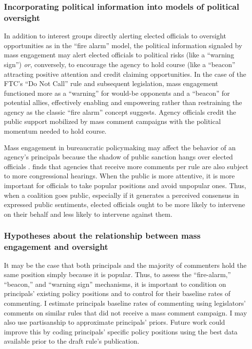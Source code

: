 \subsubsection{Incorporating political information into models of political oversight}
In addition to interest groups directly alerting elected officials to oversight opportunities as in the ``fire alarm'' model,
the political information signaled by mass engagement may alert elected officials to political risks (like a ``warning sign'')
\emph{or}, conversely, to encourage the agency to hold course (like a ``beacon'' attracting positive attention and credit claiming opportunities. In the case of the FTC's ``Do Not Call'' rule and subsequent legislation, mass engagement functioned more as a ``warning'' for would-be opponents and a ``beacon'' for potential allies, effectively enabling and empowering rather than restraining the agency as the classic ``fire alarm'' concept suggests. Agency officials credit the public support mobilized by mass comment campaigns with the political momentum needed to hold course. 

Mass engagement in bureaucratic policymaking may affect the behavior of an agency's principals because the shadow of public sanction hangs over elected officials \citep{Arnold1979, Mayhew2000}. \citet{Moore2018} finds that agencies that receive more comments per rule are also subject to more congressional hearings. When the public is more attentive, it is more important for officials to take popular positions and avoid unpopular ones.
Thus, when a coalition goes public, especially if it generates a perceived consensus in expressed public sentiments, elected officials ought to be more likely to intervene on their behalf and less likely to intervene against them.  

\subsubsection{Hypotheses about the relationship between mass engagement and oversight}


It may be the case that both principals and the majority of commenters hold the same position simply because it is popular. Thus, to assess the ``fire-alarm,'' ``beacon,'' and ``warning sign'' mechanisms, it is important to condition on principals' existing policy positions and to control for their baseline rates of commenting. I estimate principals baseline rates of commenting using legislators' comments on similar rules that did not receive a mass comment campaign. I may also use partisanship to approximate principals' priors. Future work could improve this by coding principals' specific policy positions using the best data available prior to the draft rule's publication.

